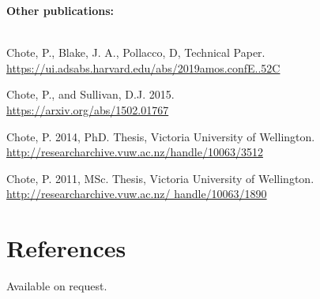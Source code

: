 \documentclass[print]{cv-style}
\begin{document}
{\bf Other publications:}\\
~\vspace{-2mm}\\
\begin{entrylist}
  {\small Chote, P., Blake, J. A., Pollacco, D, Technical Paper.\\
  \url{https://ui.adsabs.harvard.edu/abs/2019amos.confE..52C}}
  
  {\small Chote, P., and Sullivan, D.J. 2015.\\
  \url{https://arxiv.org/abs/1502.01767}}

  {\small Chote, P. 2014, PhD. Thesis, Victoria University of Wellington.\\
  \url{http://researcharchive.vuw.ac.nz/handle/10063/3512}}

  {\small Chote, P. 2011, MSc. Thesis, Victoria University of Wellington.\\ \url{http://researcharchive.vuw.ac.nz/ handle/10063/1890}}
\end{entrylist}
\section{References}
{\small Available on request.}
\end{document}
